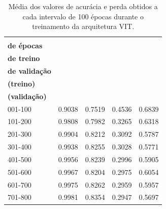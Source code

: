 \begin{table}[h]
	\centering
	\caption{Média dos valores de acurácia e perda obtidos a cada intervalo de 100 épocas durante o treinamento da arquitetura \acs{VIT}.}
	\label{tab:vit_mean_results_800}
	\begin{tabular}{l|c|c|c|c}
		
		\toprule
		\makecell{\textbf{Faixa} \\ \textbf{de épocas}}&
		\makecell{\textbf{Acurácia}\\ \textbf{de treino}} &
		\makecell{\textbf{Acurácia}\\ \textbf{de validação}} &
		\makecell{\textbf{Perda}\\ \textbf{(treino)}} &
		\makecell{\textbf{Perda}\\ \textbf{(validação)}} \\
		\midrule
		
		001-100 & 0.9038 & 0.7519 & 0.4536 & 0.6839 \\
		101-200 & 0.9808 & 0.7982 & 0.3265 & 0.6318 \\
		201-300 & 0.9904 & 0.8212 & 0.3092 & 0.5787 \\
		301-400 & 0.9938 & 0.8255 & 0.3028 & 0.5771 \\
		401-500 & 0.9956 & 0.8239 & 0.2996 & 0.5905 \\
		501-600 & 0.9967 & 0.8204 & 0.2975 & 0.6054 \\
		601-700 & 0.9975 & 0.8262 & 0.2959 & 0.5957 \\
		701-800 & 0.9981 & 0.8354 & 0.2947 & 0.5697 \\
		
		\bottomrule
	\end{tabular}
\end{table}

